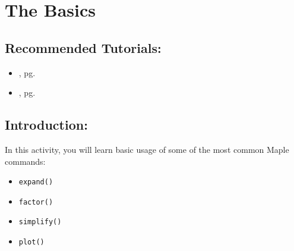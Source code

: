 \section{The Basics}
\label{sec:basics}

\subsection*{Recommended Tutorials:}
\begin{itemize}[noitemsep]
	\item {}, pg. \pageref{chp:basic_operations}
	\item {}, pg. \pageref{chp:plotting_functions}
\end{itemize}

\subsection*{Introduction:}

In this activity, you will learn basic usage of some of the most common Maple commands:
\par
\begin{minipage}[t]{0.5\textwidth}
\begin{itemize}
\item \texttt{expand()}
\item \texttt{factor()}
\end{itemize}
\end{minipage}
\begin{minipage}[t]{0.5\textwidth}
\begin{itemize}
\item \texttt{simplify()}
\item \texttt{plot()}
\end{itemize}
\end{minipage}

